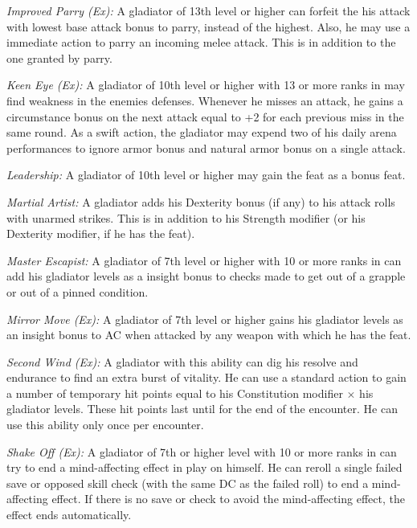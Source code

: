 \textit{Improved Parry (Ex):} A gladiator of 13th level or higher can forfeit the his attack with lowest base attack bonus to parry, instead of the highest. Also, he may use a immediate action to parry an incoming melee attack. This is in addition to the one granted by parry.

\textit{Keen Eye (Ex):} A gladiator of 10th level or higher with 13 or more ranks in  may find weakness in the enemies defenses. Whenever he misses an attack, he gains a circumstance bonus on the next attack equal to +2 for each previous miss in the same round. As a swift action, the gladiator may expend two of his daily arena performances to ignore armor bonus and natural armor bonus on a single attack. 

\textit{Leadership:} A gladiator of 10th level or higher may gain the  feat as a bonus feat.

\textit{Martial Artist:} A gladiator adds his Dexterity bonus (if any) to his attack rolls with unarmed strikes. This is in addition to his Strength modifier (or his Dexterity modifier, if he has the  feat).

\textit{Master Escapist:} A gladiator of 7th level or higher with 10 or more ranks in  can add \onehalf his gladiator levels as a insight bonus to  checks made to get out of a grapple or out of a pinned condition.

\textit{Mirror Move (Ex):} A gladiator of 7th level or higher gains \onequarter his gladiator levels as an insight bonus to AC when attacked by any weapon with which he has the  feat.

\textit{Second Wind (Ex):} A gladiator with this ability can dig his resolve and endurance to find an extra burst of vitality. He can use a standard action to gain a number of temporary hit points equal to his Constitution modifier $\times$ his gladiator levels. These hit points last until for the end of the encounter. He can use this ability only once per encounter.

\textit{Shake Off (Ex):} A gladiator of 7th or higher level with 10 or more ranks in  can try to end a mind-affecting effect in play on himself. He can reroll a single failed save or opposed skill check (with the same DC as the failed roll) to end a mind-affecting effect. If there is no save or check to avoid the mind-affecting effect, the effect ends automatically.


